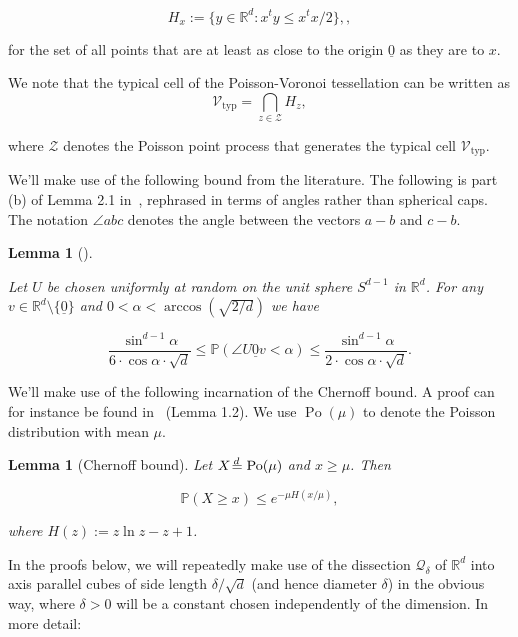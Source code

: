 \documentclass[11pt]{article}%
\newtheorem{lemma} [theorem] {Lemma}%
\newcommand{\Qcal}[0]{\ensuremath{{\mathcal Q}}}
\newcommand{\Vcal}[0]{\ensuremath{{\mathcal V}}}
\newcommand{\Zcal}[0]{\ensuremath{{\mathcal Z}}}
\newcommand{\eR}[0]{\ensuremath{ \mathbb R}}
\newcommand{\Pee}[0]{\ensuremath{{\mathbb P}}}
\newcommand{\isd}[0]{\hspace{.2ex} \raisebox{-.1ex}{$=$} \hspace{-1.5ex} 
\raisebox{1ex}{{$\scriptstyle d$}} \hspace{.8ex} }
\newcommand{\orig}{\underline{0}}
\DeclareMathOperator{\Po}{Po}
\newcommand{\Vtyp}[0]{\Vcal_{\text{typ}}}
\begin{document}
\begin{equation}\label{eq:Hxdef} 
H_x := \{ y \in \eR^d : x^t y \leq x^tx/2  \},, 
\end{equation}

\noindent
for the set of all points that are at least as close to the origin $\orig$ as they are to $x$.

We note that the typical cell of the Poisson-Voronoi tessellation can be written as
\begin{equation}\label{eq:altCdef} 
\Vtyp = \bigcap_{z\in\Zcal} H_z, 
\end{equation}


\noindent
where $\Zcal$ denotes the Poisson point process that generates the typical cell $\Vtyp$.

We'll make use of the following bound from the literature. 
The following is part (b) of Lemma 2.1 in~\cite{BriedenEtal}, rephrased in terms of angles rather than 
spherical caps.
The notation $\angle abc$ denotes the angle between the vectors $a-b$ and $c-b$.

\begin{lemma}[\cite{BriedenEtal}]\label{lem:X}

 Let $U$ be chosen uniformly at random on the unit sphere $S^{d-1}$ in $\eR^d$.
 For any $v \in \eR^d \setminus \{\orig\}$ and $0< \alpha < \arccos(\sqrt{2/d})$ we have
 
 $$ \frac{\sin^{d-1}\alpha}{6\cdot\cos\alpha\cdot\sqrt{d}} \leq
 \Pee( \angle U{\orig}v < \alpha ) \leq \frac{\sin^{d-1}\alpha}{2\cdot \cos\alpha\cdot\sqrt{d}}. $$
 
 \end{lemma} 


We'll make use of the following incarnation of the Chernoff bound.
A proof can for instance be found in~\cite{Penroseboek} (Lemma 1.2). 
We use $\Po(\mu)$ to denote the Poisson distribution with mean $\mu$.

\begin{lemma}[Chernoff bound]\label{lem:chernoff}
Let $X \isd \Po(\mu)$ and $x \geq \mu$. Then 

$$ \Pee( X \geq x ) \leq e^{-\mu H(x/\mu)}, $$
 
\noindent
where $H(z) := z\ln z-z+1$.
\end{lemma}

In the proofs below, we will repeatedly make use of the dissection $\Qcal_\delta$ of $\eR^d$ into axis parallel cubes of side length 
$\delta/\sqrt{d}$ (and hence diameter $\delta$) in the obvious way, where $\delta>0$ will be a constant chosen 
independently of the dimension.
In more detail:
\end{document}
